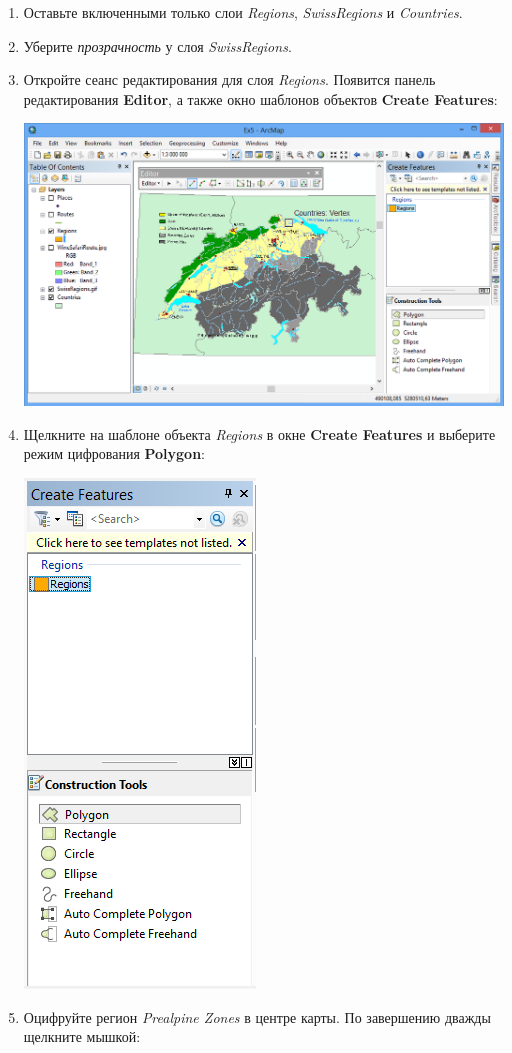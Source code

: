\documentclass[]{book}
\theoremstyle{definition}
\theoremstyle{definition}
\theoremstyle{definition}
\theoremstyle{remark}
\begin{document}
\begin{enumerate}
\def\labelenumi{\arabic{enumi}.}
\item
  Оставьте включенными только слои \emph{Regions}, \emph{SwissRegions} и
  \emph{Countries}.
\item
  Уберите \emph{прозрачность} у слоя \emph{SwissRegions}.
\item
  Откройте сеанс редактирования для слоя \emph{Regions}. Появится панель
  редактирования \textbf{Editor}, а также окно шаблонов объектов
  \textbf{Create Features}:

  \includegraphics{images/Ex07/image15.png}
\item
  Щелкните на шаблоне объекта \emph{Regions} в окне \textbf{Create
  Features} и выберите режим цифрования \textbf{Polygon}:

  \includegraphics{images/Ex07/image16.png}
\item
  Оцифруйте регион \emph{Prealpine Zones} в центре карты. По завершению
  дважды щелкните мышкой:


\end{enumerate}
\end{document}
